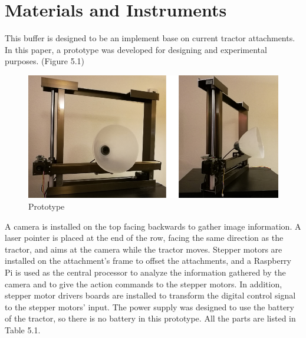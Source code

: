 \documentclass[letterpaper,12pt,oneside]{book}
\begin{document}
		\section{Materials and Instruments}
		This buffer is designed to be an implement base on current tractor attachments. In this paper, a prototype was developed for designing and experimental purposes. (Figure 5.1) 
		\begin{figure}[ht!]
			\begin{center}
				\includegraphics[scale = 0.6]{prototype.png}
				\caption{Prototype}
			\end{center}
		\end{figure}
		A camera is installed on the top facing backwards to gather image information. A laser pointer is placed at the end of the row, facing the same direction as the tractor,  and aims at the camera while the tractor moves. Stepper motors are installed on the attachment's frame to offset the attachments, and a Raspberry Pi is used as the central processor to analyze the information gathered by the camera and to give the action commands to the stepper motors. In addition, stepper motor drivers boards are installed to transform the digital control signal to the stepper motors' input. The power supply was designed to use the battery of the tractor, so there is no battery in this prototype. All the parts are listed in Table 5.1.
		
\end{document}
